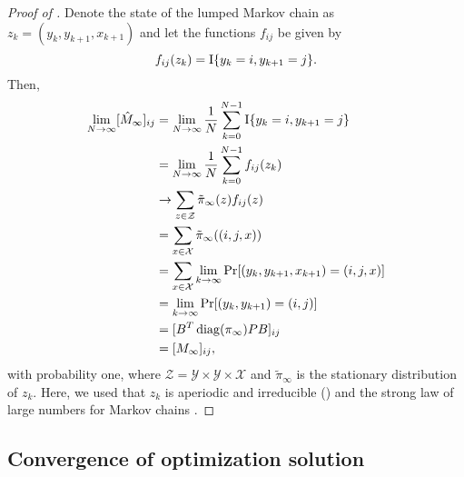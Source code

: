 \documentclass[journal]{IEEEtran}
\newcommand{\hMii}{\hat M_\infty}
\begin{document}
\begin{proof}[Proof of ]
    Denote the state of the lumped Markov chain as $z_k = (y_k, y_{k+1},
    x_{k+1})$ and let the functions $f_{ij}$ be given by
    \begin{equation}
        f_{ij}(z_k) = \text{I}\{y_k = i, y_{k+1} = j\}.
    \end{equation}
    Then,
    \begin{align*}
        \lim_{N\rightarrow\infty} [\hMii]_{ij} &= \lim_{N\to \infty} \frac{1}{N} \sum_{k=0}^{N-1}
        \ind{y_k = i, y_{k+1} = j} \\
        &= \lim_{N\to \infty} \frac{1}{N} \sum_{k=0}^{N-1} f_{ij}(z_k) \\
        &\rightarrow \sum_{z \in \mathcal{Z}} \tilde \pi_\infty(z) f_{ij}(z) \\
        &= \sum_{x\in\mathcal{X}}\tilde \pi_\infty((i,j,x)) \\
        &= \sum_{x\in\mathcal{X}} \lim_{k\to\infty} \Pr{(y_k, y_{k+1}, x_{k+1})
        = (i,j,x)} \\
        &= \lim_{k\to\infty} \Pr{(y_k, y_{k+1}) = (i,j)} \\
        &= [B^T \diag{\pi_\infty} PB]_{ij} \\
        &= [M_\infty]_{ij},
    \end{align*}
    with probability one, where $\mathcal{Z} = \mathcal{Y} \times \mathcal{Y}
    \times \mathcal{X}$ and $\tilde \pi_\infty$ is the stationary distribution of
    $z_k$. Here, we used that $z_k$ is aperiodic and irreducible
    () and the strong law of large numbers for
    Markov chains \cite[Theorem 14.2.53]{cappe_inference_2005}.
\end{proof}

\subsection{Convergence of optimization solution}
\end{document}
